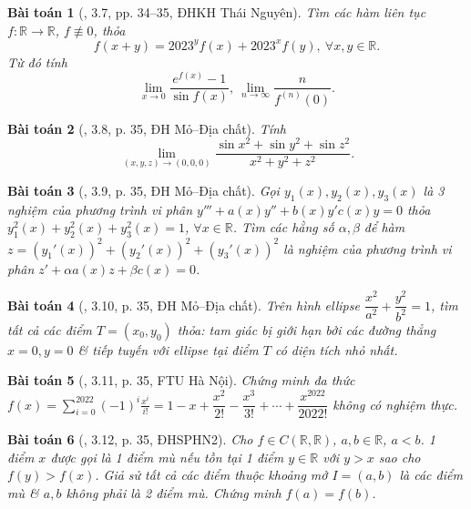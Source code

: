 \documentclass[oneside]{book}
\newtheorem{baitoan}{Bài toán}
\begin{document}
\begin{baitoan}[\cite{VMS_VMC2023}, 3.7, pp. 34--35, ĐHKH Thái Nguyên]
	Tìm các hàm liên tục $f:\mathbb{R}\to\mathbb{R}$, $f\not\equiv0$, thỏa
	\begin{equation*}
		f(x + y) = 2023^yf(x) + 2023^xf(y),\ \forall x,y\in\mathbb{R}.
	\end{equation*}
	Từ đó tính
	\begin{equation*}
		\lim_{x\to0} \frac{e^{f(x)} - 1}{\sin f(x)},\ \lim_{n\to\infty} \frac{n}{f^{(n)}(0)}.
	\end{equation*}
\end{baitoan}

\begin{baitoan}[\cite{VMS_VMC2023}, 3.8, p. 35, ĐH Mỏ--Địa chất]
	Tính
	\begin{equation*}
		\lim_{(x,y,z)\to(0,0,0)} \frac{\sin x^2 + \sin y^2 + \sin z^2}{x^2 + y^2 + z^2}.
	\end{equation*}
\end{baitoan}

\begin{baitoan}[\cite{VMS_VMC2023}, 3.9, p. 35, ĐH Mỏ--Địa chất]
	Gọi $y_1(x),y_2(x),y_3(x)$ là 3 nghiệm của phương trình vi phân $y''' + a(x)y'' + b(x)y' c(x)y = 0$ thỏa $y_1^2(x) + y_2^2(x) + y_3^2(x) = 1$, $\forall x\in\mathbb{R}$. Tìm các hằng số $\alpha,\beta$ để hàm $z = (y_1'(x))^2 + (y_2'(x))^2 + (y_3'(x))^2$ là nghiệm của phương trình vi phân $z' + \alpha a(x)z + \beta c(x) = 0$.
\end{baitoan}

\begin{baitoan}[\cite{VMS_VMC2023}, 3.10, p. 35, ĐH Mỏ--Địa chất]
	Trên hình ellipse $\dfrac{x^2}{a^2} + \dfrac{y^2}{b^2} = 1$, tìm tất cả các điểm $T = (x_0,y_0)$ thỏa: tam giác bị giới hạn bởi các đường thẳng $x = 0,y = 0$ \& tiếp tuyến với ellipse tại điểm $T$ có diện tích nhỏ nhất.
\end{baitoan}

\begin{baitoan}[\cite{VMS_VMC2023}, 3.11, p. 35, FTU Hà Nội]
	Chứng minh đa thức $f(x) = \sum_{i=0}^{2022} (-1)^i\frac{x^i}{i!} = 1 - x + \dfrac{x^2}{2!} - \dfrac{x^3}{3!} + \cdots + \dfrac{x^{2022}}{2022!}$ không có nghiệm thực.
\end{baitoan}

\begin{baitoan}[\cite{VMS_VMC2023}, 3.12, p. 35, ĐHSPHN2]
	Cho $f\in C(\mathbb{R},\mathbb{R})$, $a,b\in\mathbb{R}$, $a < b$. 1 điểm $x$ được gọi là 1 {\rm điểm mù} nếu tồn tại 1 điểm $y\in\mathbb{R}$ với $y > x$ sao cho $f(y) > f(x)$. Giả sử tất cả các điểm thuộc khoảng mở $I = (a,b)$ là các điểm mù \& $a,b$ không phải là 2 điểm mù. Chứng minh $f(a) = f(b)$.
\end{baitoan}
\end{document}
